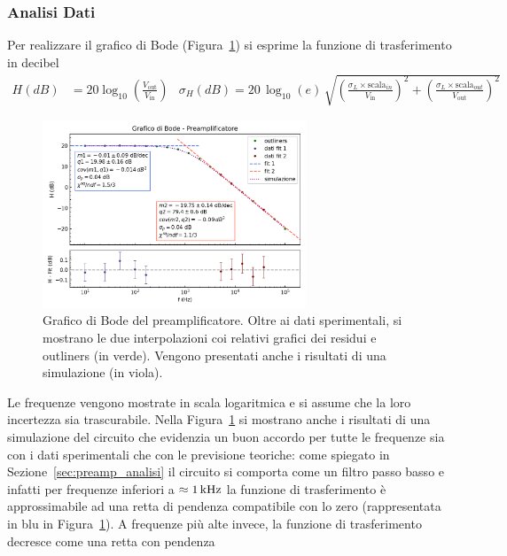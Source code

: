 \subsubsection{Analisi Dati}\label{sec:bode_analisi}
Per realizzare il grafico di Bode (Figura~\ref{fig:preamp_fit_bode}) si esprime la funzione di trasferimento
in decibel
\begin{align}
  H(dB) &= 20\log_{10}{\left(\frac{V_{\text{out}}}{V_{\text{in}}}\right)}
  &
    \sigma_{H}(dB) = 20\,\log_{10}{(e)}\,\sqrt{{\left(\frac{\sigma_{L}\times \text{scala}_{in}}{V_{\text{in}}}\right)}^{2}+
    {\left(\frac{\sigma_{L}\times \text{scala}_{out}}{V_{\text{out}}}\right)}^{2}}
\end{align}
\begin{figure}[h]
\centering
\includegraphics[width=0.7\textwidth]{../preamp/images/fit_bode}
\caption{\footnotesize Grafico di Bode del preamplificatore. Oltre ai dati sperimentali, si mostrano le due interpolazioni coi relativi
grafici dei residui e outliners (in verde). Vengono presentati anche i risultati di una simulazione (in viola).}\label{fig:preamp_fit_bode}
\end{figure}
Le frequenze vengono mostrate in scala logaritmica e si assume che la
loro incertezza sia trascurabile.
 Nella Figura~\ref{fig:preamp_fit_bode} si mostrano anche i
risultati di una simulazione del circuito che evidenzia un buon accordo per tutte le frequenze sia con i dati sperimentali che con le previsione teoriche: come spiegato in Sezione~\ref{sec:preamp_analisi} il circuito si comporta come un filtro passo basso e infatti per frequenze inferiori a $\approx 1\kHz$ la funzione di trasferimento
è approssimabile ad una retta di pendenza compatibile con lo zero (rappresentata in blu in Figura~\ref{fig:preamp_fit_bode}). A frequenze più alte invece,
la funzione di trasferimento decresce come una retta con pendenza
